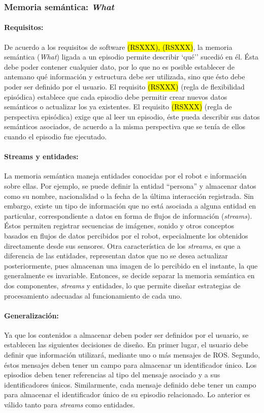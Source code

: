 \subsubsection{Memoria semántica: \textit{What}}

\paragraph{Requisitos:}
De acuerdo a los requisitos de software \hl{(RSXXX), (RSXXX)}, la memoria semántica (\textit{What}) ligada a un episodio permite describir `qué'' sucedió en él. Ésta debe poder  contener cualquier dato, por lo que no es posible establecer de antemano qué información y estructura debe ser utilizada, sino que ésto debe poder ser definido por el usuario. El requisito \hl{(RSXXX)} (regla de flexibilidad episódica) establece que cada episodio debe permitir crear nuevos datos semánticos o actualizar los ya existentes. El requisito \hl{(RSXXX)} (regla de perspectiva episódica) exige que al leer un episodio, éste pueda describir sus datos semánticos asociados, de acuerdo a la misma perspectiva que se tenía de ellos cuando el episodio fue ejecutado.


\paragraph{Streams y entidades:} 
La memoria semántica maneja entidades conocidas por el robot e información sobre ellas. Por ejemplo, se puede definir la entidad ``persona'' y almacenar datos como su nombre, nacionalidad o la fecha de la última interacción registrada. Sin embargo, existe un tipo de información que no está asociada a alguna entidad en particular, correspondiente a datos en forma de flujos de información (\textit{streams}). Éstos permiten registrar secuencias de imágenes, sonido y otros conceptos basados en flujos de datos percibidos por el robot, especialmente los obtenidos directamente desde sus sensores. Otra característica de los \textit{streams}, es que a diferencia de las entidades, representan datos que no se desea actualizar posteriormente, pues almacenan una imagen de lo percibido en el instante, la que generalmente es invariable. Entonces, se decide separar la memoria semántica en dos componentes, \textit{streams} y entidades, lo que permite diseñar estrategias de procesamiento adecuadas al funcionamiento de cada uno.


\paragraph{Generalización:}
Ya que los contenidos a almacenar deben poder ser definidos por el usuario, se establecen las siguientes decisiones de diseño. En primer lugar, el usuario debe definir que información utilizará, mediante uno o más mensajes de ROS. Segundo, éstos mensajes deben tener un campo para almacenar un identificador único. Los episodios deben tener referencias al tipo del mensaje asociado y a sus identificadores únicos. Similarmente, cada mensaje definido debe tener un campo para almacenar el identificador único de su episodio relacionado. Lo anterior es válido tanto para \textit{streams} como entidades.


